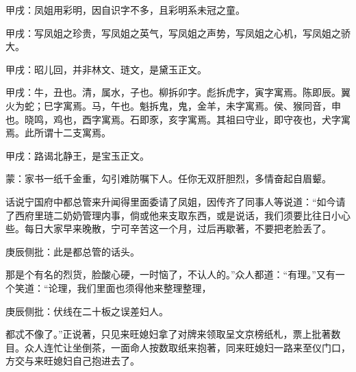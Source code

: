 
\begin{parag}

    \begin{note}甲戌：凤姐用彩明，因自识字不多，且彩明系未冠之童。\end{note}
\end{parag}


\begin{parag}


    \begin{note}甲戌：写凤姐之珍贵，写凤姐之英气，写凤姐之声势，写凤姐之心机，写凤姐之骄大。\end{note}
\end{parag}


\begin{parag}


    \begin{note}甲戌：昭儿回，并非林文、琏文，是黛玉正文。\end{note}
\end{parag}


\begin{parag}


    \begin{note}甲戌：牛，丑也。清，属水，子也。柳拆卯字。彪拆虎字，寅字寓焉。陈即辰。翼火为蛇；巳字寓焉。马，午也。魁拆鬼，鬼，金羊，未字寓焉。侯、猴同音，申也。晓鸣，鸡也，酉字寓焉。石即豕，亥字寓焉。其祖曰守业，即守夜也，犬字寓焉。此所谓十二支寓焉。\end{note}
\end{parag}


\begin{parag}


    \begin{note}甲戌：路谒北静王，是宝玉正文。\end{note}
\end{parag}


\begin{parag}


    \begin{note}蒙：家书一纸千金重，勾引难防嘱下人。任你无双肝胆烈，多情奋起自眉颦。\end{note}
\end{parag}

\begin{parag}

    话说宁国府中都总管来升闻得里面委请了凤姐，因传齐了同事人等说道：“如今请了西府里琏二奶奶管理内事，倘或他来支取东西，或是说话，我们须要比往日小心些。每日大家早来晚散，宁可辛苦这一个月，过后再歇著，不要把老脸丢了。\begin{note}庚辰侧批：此是都总管的话头。\end{note}那是个有名的烈货，脸酸心硬，一时恼了，不认人的。”众人都道：“有理。”又有一个笑道：“论理，我们里面也须得他来整理整理，\begin{note}庚辰侧批：伏线在二十板之误差妇人。\end{note}都忒不像了。”正说著，只见来旺媳妇拿了对牌来领取呈文京榜纸札，票上批著数目。众人连忙让坐倒茶，一面命人按数取纸来抱著，同来旺媳妇一路来至仪门口，方交与来旺媳妇自己抱进去了。
\end{parag}


